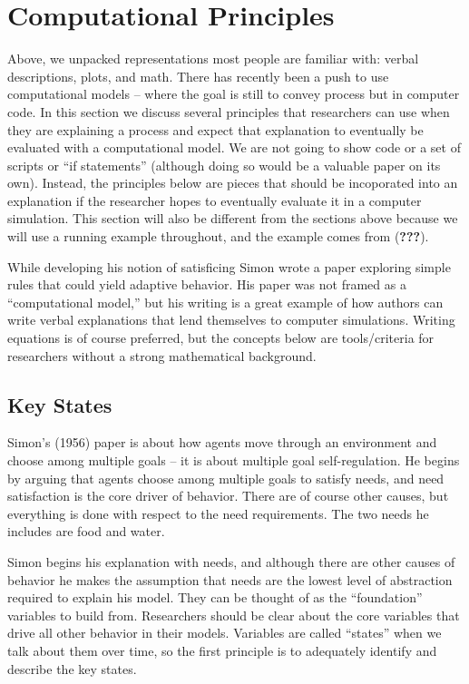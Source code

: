 \documentclass[english,,man]{apa6}
\theoremstyle{definition}
\theoremstyle{definition}
\theoremstyle{definition}
\theoremstyle{remark}
\begin{document}
\hypertarget{computational-principles}{%
\section{Computational Principles}\label{computational-principles}}

Above, we unpacked representations most people are familiar with: verbal
descriptions, plots, and math. There has recently been a push to use
computational models -- where the goal is still to convey process but in
computer code. In this section we discuss several principles that
researchers can use when they are explaining a process and expect that
explanation to eventually be evaluated with a computational model. We
are not going to show code or a set of scripts or \enquote{if
statements} (although doing so would be a valuable paper on its own).
Instead, the principles below are pieces that should be incoporated into
an explanation if the researcher hopes to eventually evaluate it in a
computer simulation. This section will also be different from the
sections above because we will use a running example throughout, and the
example comes from ({\textbf{???}}).

While developing his notion of satisficing Simon wrote a paper exploring
simple rules that could yield adaptive behavior. His paper was not
framed as a \enquote{computational model,} but his writing is a great
example of how authors can write verbal explanations that lend
themselves to computer simulations. Writing equations is of course
preferred, but the concepts below are tools/criteria for researchers
without a strong mathematical background.

\hypertarget{key-states}{%
\subsection{Key States}\label{key-states}}

Simon's (1956) paper is about how agents move through an environment and
choose among multiple goals -- it is about multiple goal
self-regulation. He begins by arguing that agents choose among multiple
goals to satisfy needs, and need satisfaction is the core driver of
behavior. There are of course other causes, but everything is done with
respect to the need requirements. The two needs he includes are food and
water.

Simon begins his explanation with needs, and although there are other
causes of behavior he makes the assumption that needs are the lowest
level of abstraction required to explain his model. They can be thought
of as the \enquote{foundation} variables to build from. Researchers
should be clear about the core variables that drive all other behavior
in their models. Variables are called \enquote{states} when we talk
about them over time, so the first principle is to adequately identify
and describe the key states.
\end{document}
